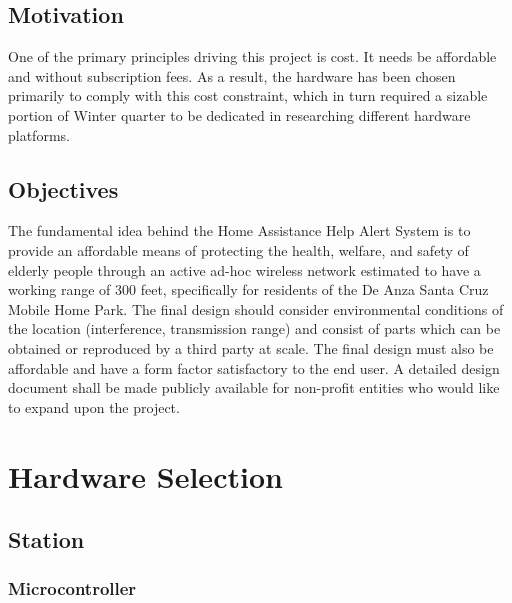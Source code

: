 \documentclass[journal,compsoc]{IEEEtran}
\begin{document}
\subsection{Motivation}
One of the primary principles driving this project is cost.  It needs be affordable and without subscription fees.  As a result, the hardware has been chosen primarily to comply with this cost constraint, which in turn required a sizable portion of Winter quarter to be dedicated in researching different hardware platforms.

\subsection{Objectives}
The fundamental idea behind the Home Assistance Help Alert System is to provide an affordable means of protecting the health, welfare, and safety of elderly people through an active ad-hoc wireless network estimated to have a working range of 300 feet, specifically for residents of the De Anza Santa Cruz Mobile Home Park.  The final design should consider environmental conditions of the location (interference, transmission range) and consist of parts which can be obtained or reproduced by a third party at scale.  The final design must also be affordable and have a form factor satisfactory to the end user.  A detailed design document shall be made publicly available for non-profit entities who would like to expand upon the project.

\section{Hardware Selection}

\subsection{Station}

\subsubsection{Microcontroller}
\end{document}
